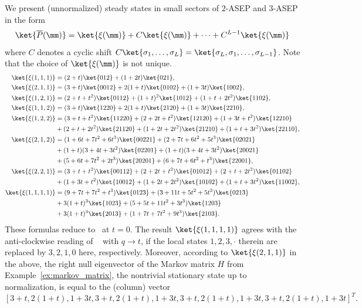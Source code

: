 \begin{exam}\label{ex:pbar}
We present (unnormalized) steady states in small sectors of 
$2$-ASEP and $3$-ASEP in the form
\begin{align*}
 \ket{\overline{P}(\mm)} = \ket{\xi(\mm)} + C\ket{\xi(\mm)}
 + \cdots + C^{L-1}\ket{\xi(\mm)}
 \end{align*}
 where $C$ denotes a cyclic shift 
 $C\ket{\sigma_1,\ldots, \sigma_L} = \ket{\sigma_L, \sigma_1, \ldots, \sigma_{L-1}}$.
 Note that the choice of $\ket{\xi(\mm)}$ is not unique.
\begin{align*}
\ket{\xi(1,1,1)} &= (2+t)\ket{012} + (1+2t)\ket{021},
\\
\ket{\xi(2,1,1)} &=(3+t)\ket{0012} + 2(1+t)\ket{0102}+(1+3t)\ket{1002},
\\
\ket{\xi(1,2,1)} &=(2+t+t^2)\ket{0112}+(1+t)^2\ket{1012} + (1+t+2t^2)\ket{1102},
\\
\ket{\xi(1,1,2)} &= (3+t)\ket{1220} +2(1+t) \ket{2120} + (1+3t)\ket{2210},
\\
\ket{\xi(1,2,2)} & =(3+t+t^2) \ket{11220} + (2+2t+t^2) \ket{12120} + 
(1+3t+t^2)\ket{12210} 
\\
&+ (2+t+2t^2) \ket{21120} +(1+2t+2t^2) \ket{21210} + (1+t+3t^2)\ket{22110},\\
 \ket{\xi(2,1,2)} & =(1 + 6 t + 7 t^2 + 6 t^3)\ket{ 00221} 
 + (2 + 7 t + 6 t^2 + 5 t^3) \ket{ 02021}
 \\ & + (1 + t) (3 + 4 t + 3 t^2)\ket{ 02201} 
 + (1 + t) (3 + 4 t + 3 t^2) \ket{ 20021}
 \\& + (5 + 6 t + 7 t^2 + 2 t^3) \ket{ 20201} 
 + (6 + 7 t + 6 t^2 + t^3) \ket{ 22001},\\
 \ket{\xi(2,2,1)} & =(3 + t + t^2) \ket{ 00112} + (2 + 2 t + t^2) \ket{ 01012} 
 + (2 + t + 2 t^2) \ket{ 01102}
 \\
 & + (1 + 3 t + t^2)\ket{ 10012} +(1 + 2 t + 2 t^2) \ket{10102} + 
 (1 + t + 3 t^2)\ket{ 11002},\\
%
 \ket{\xi(1,1,1,1)} & =  (9 + 7 t + 7 t^2 + t^3) \ket{0123}  
 + (3 + 11 t + 5 t^2 + 5 t^3) \ket{0213}  
 \\
& + 3 (1 + t)^3\ket{1023}  + 
 (5 + 5 t + 11 t^2 + 3 t^3) \ket{1203}  
 \\
 &+ 3 (1 + t)^3\ket{2013}  
 + (1 + 7 t + 7 t^2 + 9 t^3)\ket{2103}.
\end{align*}
These formulas reduce to~\cite[Ex.2.1]{KMO2} at $t=0$.
The result $ \ket{\xi(1,1,1,1)}$ agrees with the anti-clockwise reading of ~\cite[Fig.1.3]{Martin20} with $q\rightarrow t$, if the local states $1,2,3,\cdot$ therein are replaced by $3,2,1,0$ here, respectively.
Moreover, according to $\ket{\xi(2,1,1)}$ in the above, the right null eigenvector of the Markov matrix $H$ from Example~\ref{ex:markov_matrix}, the nontrivial stationary state up to normalization, is equal to the (column) vector
\[
[3 + t, 2 (1 + t), 1 + 3 t, 3 + t, 2 (1 + t), 1 + 3 t, 3 + t, 2 (1 + t), 1 + 3 t, 3 + t, 2 (1 + t), 1 + 3 t]^T.
\]
 
\end{exam}

